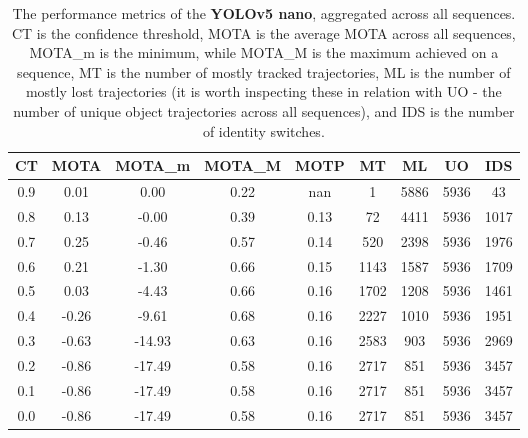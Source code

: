 \begin{table}[h]
    \centering
    \begin{tabular}{|c||c|c|c|c|c|c|c|c|}
        \hline
        CT & MOTA & MOTA\_m & MOTA\_M & MOTP & MT & ML & UO & IDS \\
        \hline
        \hline
        0.9 & 0.01 & 0.00 & 0.22 & nan & 1 & 5886 & 5936 & 43 \\
        \hline
        0.8 & 0.13 & -0.00 & 0.39 & 0.13 & 72 & 4411 & 5936 & 1017 \\
        \hline 
        0.7 & 0.25 & -0.46 & 0.57 & 0.14 & 520 & 2398 & 5936 & 1976 \\
        \hline 
        0.6 & 0.21 & -1.30 & 0.66 & 0.15 & 1143 & 1587 & 5936 & 1709 \\
        \hline 
        0.5 & 0.03 & -4.43 & 0.66 & 0.16 & 1702 & 1208 & 5936 & 1461 \\
        \hline 
        0.4 & -0.26 & -9.61 & 0.68 & 0.16 & 2227 & 1010 & 5936 & 1951 \\
        \hline 
        0.3 & -0.63 & -14.93 & 0.63 & 0.16 & 2583 & 903 & 5936 & 2969 \\
        \hline 
        0.2 & -0.86 & -17.49 & 0.58 & 0.16 & 2717 & 851 & 5936 & 3457 \\
        \hline 
        0.1 & -0.86 & -17.49 & 0.58 & 0.16 & 2717 & 851 & 5936 & 3457 \\
        \hline 
        0.0 & -0.86 & -17.49 & 0.58 & 0.16 & 2717 & 851 & 5936 & 3457 \\
        \hline
    \end{tabular}
    \caption{The performance metrics of the \textbf{YOLOv5 nano}, aggregated across all sequences. CT is the confidence threshold, MOTA is the average MOTA across all sequences, MOTA\_m is the minimum, while MOTA\_M is the maximum achieved on a sequence, MT is the number of mostly tracked trajectories, ML is the number of mostly lost trajectories (it is worth inspecting these in relation with UO - the number of unique object trajectories across all sequences), and IDS is the number of identity switches.}
    \label{tab:mota_yn}
\end{table}
